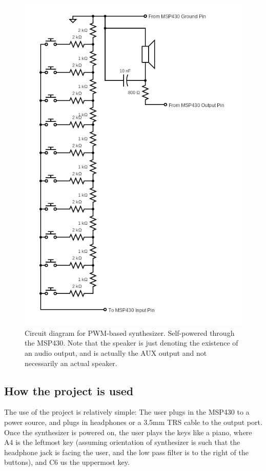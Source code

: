 \begin{figure}
    \centering
    \includegraphics[width = 0.8 \textwidth]{circuit.png}
    \caption{Circuit diagram for PWM-based synthesizer. Self-powered through the MSP430. Note that the speaker is just denoting the existence of an audio output, and is actually the AUX output and not necessarily an actual speaker. }
    \label{fig:circuit_diagram}
\end{figure}






\subsection{How the project is used}\label{subsec:how-the-project-is-used}

The use of the project is relatively simple: The user plugs in the MSP430 to a power source, and plugs in headphones or a 3.5mm TRS cable to the output port. Once the synthesizer is powered on, the user plays the keys like a piano, where A4 is the leftmost key (assuming orientation of synthesizer is such that the headphone jack is facing the user, and the low pass filter is to the right of the buttons), and C6 us the uppermost key. 


